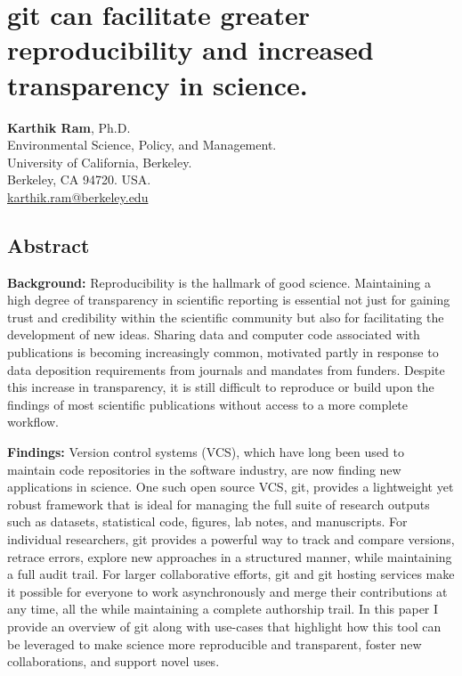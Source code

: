 \documentclass[]{article}
\author{}
\date{}
\begin{document}
\section{git can facilitate greater reproducibility and increased
transparency in science.}

\textbf{Karthik Ram}, Ph.D.\\Environmental Science, Policy, and
Management.\\University of California, Berkeley.\\Berkeley, CA 94720.
USA.\\\href{mailto:karthik.ram@berkeley.edu}{karthik.ram@berkeley.edu}

\subsection{Abstract}

\textbf{Background:} Reproducibility is the hallmark of good science.
Maintaining a high degree of transparency in scientific reporting is
essential not just for gaining trust and credibility within the
scientific community but also for facilitating the development of new
ideas. Sharing data and computer code associated with publications is
becoming increasingly common, motivated partly in response to data
deposition requirements from journals and mandates from funders. Despite
this increase in transparency, it is still difficult to reproduce or
build upon the findings of most scientific publications without access
to a more complete workflow.

\textbf{Findings:} Version control systems (VCS), which have long been
used to maintain code repositories in the software industry, are now
finding new applications in science. One such open source VCS, git,
provides a lightweight yet robust framework that is ideal for managing
the full suite of research outputs such as datasets, statistical code,
figures, lab notes, and manuscripts. For individual researchers, git
provides a powerful way to track and compare versions, retrace errors,
explore new approaches in a structured manner, while maintaining a full
audit trail. For larger collaborative efforts, git and git hosting
services make it possible for everyone to work asynchronously and merge
their contributions at any time, all the while maintaining a complete
authorship trail. In this paper I provide an overview of git along with
use-cases that highlight how this tool can be leveraged to make science
more reproducible and transparent, foster new collaborations, and
support novel uses.
\end{document}
